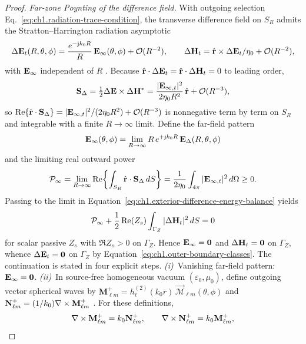 \begin{proof}
\emph{Far-zone Poynting of the difference field.} With outgoing selection Eq.~\eqref{eq:ch1.radiation-trace-condition}, the transverse difference field on $S_R$ admits the Stratton--Harrington radiation asymptotic
\begin{equation}
\label{eq:ch1.uniqueness-far-field-asymptotic}
\Delta\mathbf{E}_t(R,\theta,\phi)=\frac{e^{-\mathrm{j} k_0 R}}{R}\,\mathbf{E}_\infty(\theta,\phi)+\mathcal{O}(R^{-2}),
\qquad
\Delta\mathbf{H}_t=\hat{\mathbf{r}}\times\Delta\mathbf{E}_t/\eta_0+\mathcal{O}(R^{-2}),
\end{equation}
with $\mathbf{E}_\infty$ independent of $R$ \cite{stratton1941,harrington2001}. Because $\hat{\mathbf{r}}\cdot\Delta\mathbf{E}_t=\hat{\mathbf{r}}\cdot\Delta\mathbf{H}_t=0$ to leading order,
\begin{equation}
\label{eq:ch1.uniqueness-far-poynting-density}
\mathbf{S}_\Delta
=\tfrac12\Delta\mathbf{E}\times\Delta\mathbf{H}^*
=\frac{|\mathbf{E}_{\infty,t}|^{2}}{2\eta_0 R^{2}}\,\hat{\mathbf{r}}+\mathcal{O}(R^{-3}),
\end{equation}
so $\Re\{\hat{\mathbf{r}}\cdot\mathbf{S}_\Delta\}=|\mathbf{E}_{\infty,t}|^{2}/(2\eta_0 R^{2})+\mathcal{O}(R^{-3})$ is nonnegative term by term on $S_R$ and integrable with a finite $R\to\infty$ limit. Define the far-field pattern
\[
\mathbf{E}_\infty(\theta,\phi)=\lim_{R\to\infty}R\,e^{+\mathrm{j} k_0 R}\,\mathbf{E}_\Delta(R,\theta,\phi)
\]
and the limiting real outward power
\[
\mathcal{P}_\infty=\lim_{R\to\infty}\Re\!\left\{\int_{S_R}\hat{\mathbf{r}}\cdot\mathbf{S}_\Delta\,dS\right\}
=\frac{1}{2\eta_0}\int_{4\pi}|\mathbf{E}_{\infty,t}|^{2}\,d\Omega\ge 0.
\]
Passing to the limit in Equation~\eqref{eq:ch1.exterior-difference-energy-balance} yields
\[
\mathcal{P}_\infty+\frac{1}{2}\Re(Z_s)\int_{\Gamma_Z}|\Delta\mathbf{H}_t|^{2}\,dS=0
\]
for scalar passive $Z_s$ with $\Re Z_s>0$ on $\Gamma_Z$. Hence $\mathbf{E}_\infty=\mathbf{0}$ and $\Delta\mathbf{H}_t=\mathbf{0}$ on $\Gamma_Z$, whence $\Delta\mathbf{E}_t=\mathbf{0}$ on $\Gamma_Z$ by Equation~\eqref{eq:ch1.outer-boundary-classes}. The continuation is stated in four explicit steps. \emph{(i)}~Vanishing far-field pattern: $\mathbf{E}_\infty=\mathbf{0}$. \emph{(ii)}~In source-free homogeneous vacuum $(\varepsilon_0,\mu_0)$, define outgoing vector spherical waves by $\mathbf M_{\ell m}^{+}=h_\ell^{(2)}(k_0 r)\,\vec{\mathcal{M}}_{\ell m}(\theta,\phi)$ and $\mathbf N_{\ell m}^{+}=(1/k_0)\nabla\times\mathbf M_{\ell m}^{+}$ \cite{stratton1941,harrington2001}. For these definitions,
\begin{equation}
\label{eq:ch1.vsw-curl-identities}
\nabla\times\mathbf M_{\ell m}^{+}=k_0\mathbf N_{\ell m}^{+},
\qquad
\nabla\times\mathbf N_{\ell m}^{+}=k_0\mathbf M_{\ell m}^{+},
\end{equation}

\end{proof}
